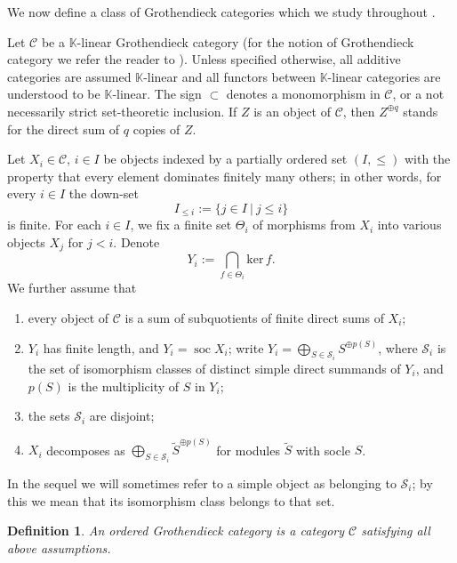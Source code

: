 \documentclass[11pt]{article}
\theoremstyle{plain}
\theoremstyle{nonumberplain}
\theoremstyle{plain}
\newtheorem{definition}[lemma]{Definition}
\theoremstyle{nonumberplain}
\newcommand\bK{{\mathbb K}}
\newcommand\cC{{\mathcal C}}
\newcommand\cS{{\mathcal S}}
\DeclareMathOperator{\soc}{\mathrm{soc}}
\newcommand{\define}[1]{{\em #1}}
\begin{document}
We now define a class of Grothendieck categories which we study throughout .

Let $\mathcal{C}$ be a $\bK$-linear Grothendieck category (for the notion of Grothendieck category we refer the reader to \cite{groth}). Unless specified otherwise, all additive categories are assumed $\bK$-linear and all functors between $\bK$-linear categories are understood to be $\bK$-linear.  The sign $\subset$ denotes a monomorphism in $\mathcal{C}$, or a not necessarily strict set-theoretic inclusion.  If $Z$ is an object of $\mathcal{C}$, then $Z^{\oplus q}$ stands for the direct sum of $q$ copies of $Z$.  

Let $X_i\in\mathcal C$, $i\in I$ be objects indexed by a partially ordered set $(I,\leq)$ with the property that every element dominates finitely many others; in other words, for every $i\in I$ the down-set
\begin{equation*}
  I_{\le i} := \{j\in I\ |\ j\le i\}
\end{equation*}
is finite. For each $i\in I$, we fix a finite set $\Theta_i$ of morphisms from $X_i$ into various objects $X_j$ for $j<i$.  Denote \[ Y_i:=\bigcap_{f\in\Theta_i}\mathrm{ker}\,f. \] We further assume that 

\renewcommand{\labelenumi}{(\arabic{enumi})}
\begin{enumerate}
\item every object of $\mathcal C$ is a sum of subquotients of finite direct sums of $X_i$;
\item $Y_i$ has finite length, and $Y_i=\soc X_i$; write $\displaystyle Y_i=\bigoplus_{S\in \cS_i}S^{\oplus p(S)}$, where $\cS_i$ is the set of isomorphism classes of distinct simple direct summands of $Y_i$, and $p(S)$ is the multiplicity of $S$ in $Y_i$;
\item the sets $\cS_i$ are disjoint;
\item $X_i$ decomposes as $\displaystyle \bigoplus_{S\in \cS_i}\widetilde S^{\oplus p(S)}$ for modules $\widetilde S$ with socle $S$. 
\end{enumerate}
In the sequel we will sometimes refer to a simple object as belonging to $\cS_i$; by this we mean that its isomorphism class belongs to that set. 





\begin{definition}
  An \define{ordered Grothendieck category} is a category $\cC$ satisfying all above assumptions. \end{definition}
\end{document}
